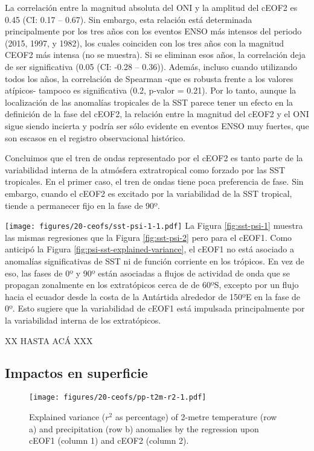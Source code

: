 \documentclass[12pt,oneside]{reedthesis}
\begin{document}
La correlación entre la magnitud absoluta del ONI y la amplitud del cEOF2 es 0.45 (CI: 0.17 -- 0.67).
Sin embargo, esta relación está determinada principalmente por los tres años con los eventos ENSO más intensos del periodo (2015, 1997, y 1982), los cuales coinciden con los tres años con la magnitud CEOF2 más intensa (no se muestra).
Si se eliminan esos años, la correlación deja de ser significativa (0.05 (CI: -0.28 -- 0.36)).
Además, incluso cuando utilizando todos los años, la correlación de Spearman -que es robusta frente a los valores atípicos- tampoco es significativa (0.2, p-valor = 0.21).
Por lo tanto, aunque la localización de las anomalías tropicales de la SST parece tener un efecto en la definición de la fase del cEOF2, la relación entre la magnitud del cEOF2 y el ONI sigue siendo incierta y podría ser sólo evidente en eventos ENSO muy fuertes, que son escasos en el registro observacional histórico.

Concluimos que el tren de ondas representado por el cEOF2 es tanto parte de la variabilidad interna de la atmósfera extratropical como forzado por las SST tropicales.
En el primer caso, el tren de ondas tiene poca preferencia de fase.
Sin embargo, cuando el cEOF2 es excitado por la variabilidad de la SST tropical, tiende a permanecer fijo en la fase de 90º.



\texttt{[image: figures/20-ceofs/sst-psi-1-1.pdf]}
La Figura \ref{fig:sst-psi-1} muestra las mismas regresiones que la Figura \ref{fig:sst-psi-2} pero para el cEOF1.
Como anticipó la Figura \ref{fig:psi-sst-explained-variance}, el cEOF1 no está asociado a anomalías significativas de SST ni de función corriente en los trópicos.
En vez de eso, las fases de 0º y 90º están asociadas a flujos de actividad de onda que se propagan zonalmente en los extratópicos cerca de de 60ºS, excepto por un flujo hacia el ecuador desde la costa de la Antártida alrededor de 150ºE en la fase de 0º.
Esto sugiere que la variabilidad de cEOF1 está impulsada principalmente por la variabilidad interna de los extratópicos.

XX HASTA ACÁ XXX

\hypertarget{impactos-en-superficie}{%
\subsection{Impactos en superficie}\label{impactos-en-superficie}}
\begin{figure}
\centering
\texttt{[image: figures/20-ceofs/pp-t2m-r2-1.pdf]}
\caption{\label{fig:pp-t2m-r2}Explained variance (\(r^2\) as percentage) of 2-metre temperature (row a) and precipitation (row b) anomalies by the regression upon cEOF1 (column 1) and cEOF2 (column 2).}
\end{figure}
\end{document}
